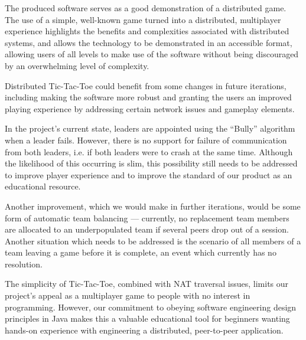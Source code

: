 \documentclass[conference]{IEEEtran}
\begin{document}
The produced software serves as a good demonstration of a distributed game. The use of a simple, well-known game turned into a distributed, multiplayer experience highlights the benefits and complexities associated with distributed systems, and allows the technology to be demonstrated in an accessible format, allowing users of all levels to make use of the software without being discouraged by an overwhelming level of complexity.

Distributed Tic-Tac-Toe could benefit from some changes in future iterations, including making the software more robust and granting the users an improved playing experience by addressing certain network issues and gameplay elements.

In the project's current state, leaders are appointed using the
``Bully'' algorithm when a leader fails. However, there is no support
for failure of communication from both leaders, i.e. if both leaders
were to crash at the same time. Although the likelihood of this
occurring is slim, this possibility still needs to be addressed to
improve player experience and to improve the standard of our product
as an educational resource.

Another improvement, which we would make in further iterations, would be some form of automatic team balancing --- currently, no replacement team members are allocated to an underpopulated team if several peers drop out of a session. Another situation which needs to be addressed is the scenario of all members of a team leaving a game before it is complete, an event which currently has no resolution.

The simplicity of Tic-Tac-Toe, combined with NAT traversal issues, limits our project's appeal as a multiplayer game to people with no interest in programming. However, our commitment to obeying software engineering design principles in Java makes this a valuable educational tool for beginners wanting hands-on experience with engineering a distributed, peer-to-peer application.





\end{document}
